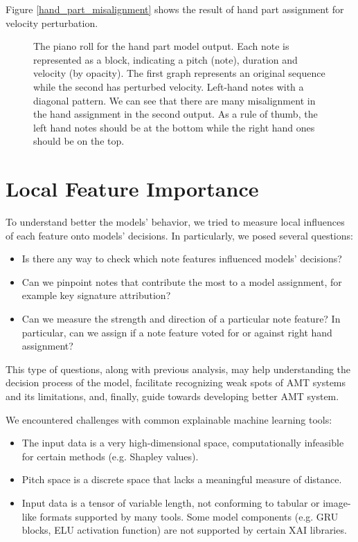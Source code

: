 Figure \ref{hand_part_misalignment} shows the result of hand part assignment for velocity perturbation.

\begin{figure}[!ht]
\centering


\caption[The piano roll for the hand part model output.]{The piano roll for the hand part model output. Each note is represented as a block, indicating a pitch (note), duration and velocity (by opacity). The first graph represents an original sequence while the second has perturbed velocity. Left-hand notes with a diagonal pattern. We can see that there are many misalignment in the hand assignment in the second output. As a rule of thumb, the left hand notes should be at the bottom while the right hand ones should be on the top.}\end{figure}

\section{Local Feature Importance}

To understand better the models' behavior, we tried to measure local influences of each feature onto models' decisions. In particularly, we posed several questions:

\begin{itemize}
	\item Is there any way to check which note features influenced models' decisions?
	\item Can we pinpoint notes that contribute the most to a model assignment, for example key signature attribution?
	\item Can we measure the strength and direction of a particular note feature? In particular, can we assign if a note feature voted for or against right hand assignment?
\end{itemize}

This type of questions, along with previous analysis, may help understanding the decision process of the model, facilitate recognizing weak spots of AMT systems and its limitations, and, finally, guide towards developing better AMT system.

We encountered challenges with common explainable machine learning tools: 

\begin{itemize}
	\item The input data is a very high-dimensional space, computationally infeasible for certain methods (e.g. Shapley values).
	\item Pitch space is a discrete space that lacks a meaningful measure of distance.
	\item Input data is a tensor of variable length, not conforming to tabular or image-like formats supported by many tools. Some model components (e.g. GRU blocks, ELU activation function) are not supported by certain XAI libraries. \missing
\end{itemize} 

